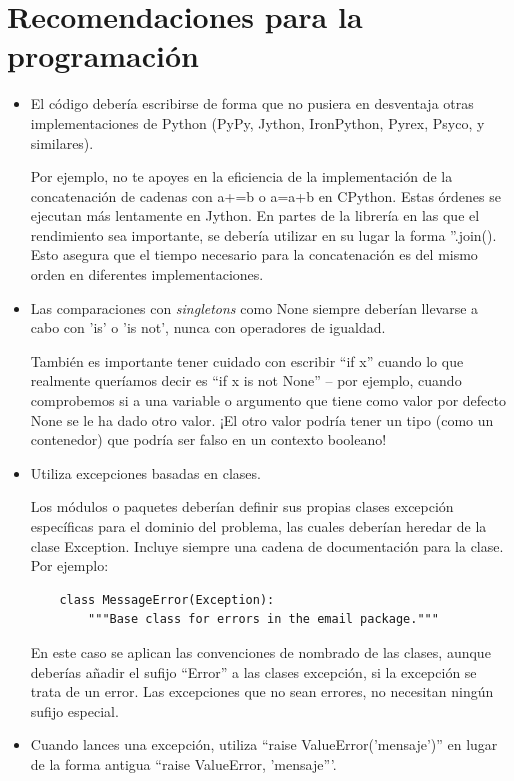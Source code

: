 \documentclass[a4paper,11pt,oneside]{book}
\begin{document}
\section{Recomendaciones para la programación}
\begin{itemize}
\item El código debería escribirse de forma que no pusiera en desventaja otras implementaciones de Python (PyPy, Jython, IronPython, Pyrex, Psyco, y similares).

Por ejemplo, no te apoyes en la eficiencia de la implementación de la concatenación de cadenas con a+=b o a=a+b en CPython. Estas órdenes se ejecutan más lentamente en Jython. En partes de la librería en las que el rendimiento sea importante, se debería utilizar en su lugar la forma ''.join(). Esto asegura que el tiempo necesario para la concatenación es del mismo orden en diferentes implementaciones.

\item Las comparaciones con  \emph{singletons} como None siempre deberían llevarse a cabo con 'is' o 'is not', nunca con operadores de igualdad.

También es importante tener cuidado con escribir ``if x'' cuando lo que realmente queríamos decir es ``if x is not None'' -- por ejemplo, cuando comprobemos si a una variable o argumento que tiene como valor por defecto None se le ha dado otro valor. ¡El otro valor podría tener un tipo (como un contenedor) que podría ser falso en un contexto booleano!

\item Utiliza excepciones basadas en clases.

Los módulos o paquetes deberían definir sus propias clases excepción específicas para el dominio del problema, las cuales deberían heredar de la clase Exception. Incluye siempre una cadena de documentación para la clase. Por ejemplo:
\begin{lstlisting}
    class MessageError(Exception):
        """Base class for errors in the email package."""
\end{lstlisting}
En este caso se aplican las convenciones de nombrado de las clases, aunque deberías añadir el sufijo ``Error'' a las clases excepción, si la excepción se trata de un error. Las excepciones que no sean errores, no necesitan ningún sufijo especial.

\item Cuando lances una excepción, utiliza ``raise ValueError('mensaje')'' en lugar de la forma antigua ``raise ValueError, 'mensaje'''.


\end{itemize}
\end{document}
